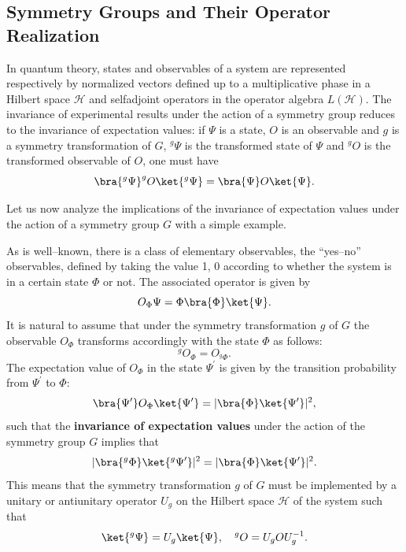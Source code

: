 \begin{example}
\end{example}

\begin{example}
\end{example}

\subsection{Symmetry Groups and Their Operator Realization}

In quantum theory, states and observables of a system are represented respectively by normalized vectors defined up to a multiplicative phase in a Hilbert space \(\mathcal{H}\) and selfadjoint operators in the operator algebra \(L(\mathcal{H})\). The invariance of experimental results under the action of a symmetry group reduces to the invariance of expectation values: if \(\Psi\) is a state, \(O\) is an observable and \(g\) is a symmetry transformation of \(G\), \(^g \Psi\) is the transformed state of \(\Psi\) and \(^g O\) is the transformed observable of \(O\), one must have
\begin{equation}
    \bra{^g \Psi} ^g O \ket{^g \Psi} = \bra{\Psi} O \ket{\Psi}.
    \label{eq:group_invariance_expectation_value_definition}
\end{equation}

Let us now analyze the implications of the invariance of expectation values under the action of a symmetry group \(G\) with a simple example.

\begin{example}
    As is well–known, there is a class of elementary observables, the “yes–no” observables, defined by taking the value 1, 0 according to whether the system is in a certain state \(\Phi\) or not. The associated operator is given by
    \[
        O_{\Phi} \Psi = \Phi \bra{\Phi} \ket{\Psi}.
    \]
    It is natural to assume that under the symmetry transformation \(g\) of \(G\) the observable \(O_{\Phi}\) transforms accordingly with the state \(\Phi\) as follows:
    \[
        ^g O_{\Phi} = O_{^g \Phi}.
    \]
    The expectation value of \(O_{\Phi}\) in the state \(\Psi^{\prime}\) is given by the transition probability from \(\Psi^{\prime}\) to \(\Phi\):
    \[
        \bra{\Psi^{\prime}} O_{\Phi} \ket{\Psi^{\prime}} = |\bra{\Phi} \ket{\Psi^{\prime}}|^2,
    \]
    such that the \textbf{invariance of expectation values} under the action of the symmetry group \(G\) implies that
    \[
        |\bra{^g \Phi} \ket{^g \Psi^{\prime}}|^2 = |\bra{\Phi} \ket{\Psi^{\prime}}|^2.
    \]
    This means that the symmetry transformation \(g\) of \(G\) must be implemented by a unitary or antiunitary operator \(U_g\) on the Hilbert space \(\mathcal{H}\) of the system such that
    \[
        \ket{^g \Psi} = U_g \ket{\Psi}, \quad ^g O = U_g O U_g^{-1}.
    \]
\end{example}

